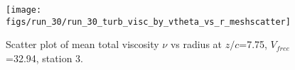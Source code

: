 \begin{figure}[H]
\centering
\texttt{[image: figs/run\_30/run\_30\_turb\_visc\_by\_vtheta\_vs\_r\_meshscatter]}
\caption{Scatter plot of mean total viscosity $\nu$ vs radius at $z/c$=7.75, $V_{free}$=32.94, station 3.}
\label{fig:run_30_turb_visc_by_vtheta_vs_r_meshscatter}
\end{figure}


